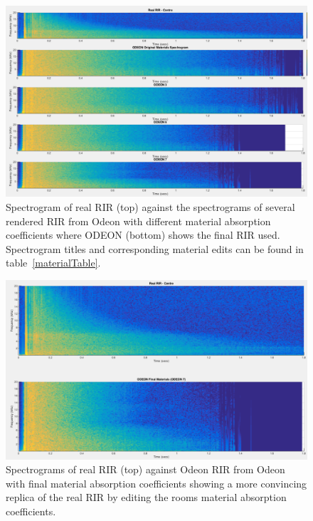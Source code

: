 \documentclass[../../main.tex]{subfiles}
\begin{document}
			\begin{figure}
				\centerline{\includegraphics[width=\textwidth]{Sections/Implementation/Odeon/images/MaterialCompare/OriginalMaterials/all.png}}
				\caption{Spectrogram of real \ac{RIR} (top) against the spectrograms of several rendered \ac{RIR} from Odeon with different material absorption coefficients where ODEON (bottom) shows the final \ac{RIR} used. Spectrogram titles and corresponding material edits can be found in table~\ref{materialTable}.}
				\label{compareAll}
			\end{figure}

			\begin{figure}
				\centerline{\includegraphics[width=\textwidth]{Sections/Implementation/Odeon/images/MaterialCompare/OriginalMaterials/new.png}}
				\caption{Spectrograms of real \ac{RIR} (top) against Odeon \ac{RIR} from Odeon with final material absorption coefficients showing a more convincing replica of the real \ac{RIR} by editing the rooms material absorption coefficients.}
				\label{compareNew}
			\end{figure}
\end{document}
